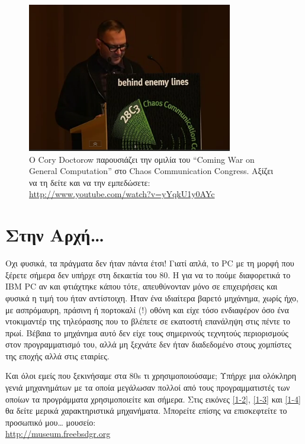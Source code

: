 \begin{figure}
  \centering
  \includegraphics[width=0.8\textwidth]{images/chapter1/1-1}
  \caption[Cory Doctorow]{Ο Cory Doctorow παρουσιάζει την ομιλία του “Coming
War on General Computation” στο Chaos Communication Congress. Αξίζει να τη
δείτε και να την εμπεδώσετε:\\ \url{http://www.youtube.com/watch?v=yYqkU1y0AYc}}
  \label{1-1}
\end{figure}

\section{Στην Αρχή\ldots}
%
Οχι φυσικά, τα πράγματα δεν ήταν πάντα έτσι!  Γιατί απλά, το PC με τη μορφή
που ξέρετε σήμερα δεν υπήρχε στη δεκαετία του 80. Η για να το πούμε
διαφορετικά το ΙΒΜ PC αν και φτιάχτηκε κάπου τότε, απευθύνονταν μόνο σε
επιχειρήσεις και φυσικά η τιμή του ήταν αντίστοιχη. Ήταν ένα ιδιαίτερα
βαρετό μηχάνημα, χωρίς ήχο, με ασπρόμαυρη, πράσινη ή πορτοκαλί (!) οθόνη και
είχε τόσο ενδιαφέρον όσο ένα ντοκιμαντέρ της τηλεόρασης που το βλέπετε σε
εκατοστή επανάληψη στις πέντε το πρωί. Βέβαια το μηχάνημα αυτό δεν είχε τους
σημερινούς τεχνητούς περιορισμούς στον προγραμματισμό του, αλλά μη ξεχνάτε
δεν ήταν διαδεδομένο στους χομπίστες της εποχής αλλά στις εταιρίες.

Και όλοι εμείς που ξεκινήσαμε στα 80s τι χρησιμοποιούσαμε; Υπήρχε μια
ολόκληρη γενιά μηχανημάτων με τα οποία μεγάλωσαν πολλοί από τους
προγραμματιστές των οποίων τα προγράμματα χρησιμοποιείτε και σήμερα. Στις
εικόνες \ref{1-2}, \ref{1-3} και \ref{1-4} θα δείτε μερικά χαρακτηριστικά
μηχανήματα. Μπορείτε επίσης να επισκεφτείτε το προσωπικό μου\ldots{} μουσείο:\\
\url{http://museum.freebsdgr.org}

